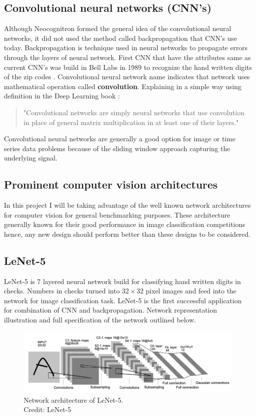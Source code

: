 \documentclass[12pt, twoside, a4paper]{article}
\begin{document}
\subsection{Convolutional neural networks (CNN's)}
Although Neocognitron formed the general idea of the convolutional neural networks, it did not used the method called backpropagation that CNN's use today. Backpropagation is technique used in neural networks to propagate errors through the layers of neural network. First CNN that have the attributes same as current CNN's was build in Bell Labs in 1989 to recognize the hand written digits of the zip codes \cite{cnnzipcodes}. Convolutional neural network name indicates that network uses mathematical operation called \textbf{convolution}. Explaining in a simple way using definition in the Deep Learning book \cite{deeplearningbook}:

\begin{quote}
    "Convolutional networks are simply neural networks that use convolution in place of general matrix multiplication in at least one of their layers."
\end{quote}

Convolutional neural networks are generally a good option for image or time series data problems because of the sliding window approach capturing the underlying signal.

\subsection{Prominent computer vision architectures}
In this project I will be taking advantage of the well known network architectures for computer vision for general benchmarking purposes. These architecture generally known for their good performance in image classification competitions hence, any new design should perform better than these designs to be considered. 

\subsection{LeNet-5}
LeNet-5 \cite{Lenet5} is 7 layered neural network build for classifying hand written digits in checks. Numbers in checks turned into  $32 \times 32$ pixel images and feed into the network for image classification task. LeNet-5 is the first successful application for combination of CNN and backpropagation. Network representation illustration and full specification of the network outlined below.

\begin{figure}[H]%
    \centering
    \includegraphics[width=\textwidth]{img/lenet-5.png}%
    \caption{Network architecture of LeNet-5.\\Credit: LeNet-5 \cite{Lenet5}}%
    \label{fig:lenet5}%
\end{figure}
\end{document}
